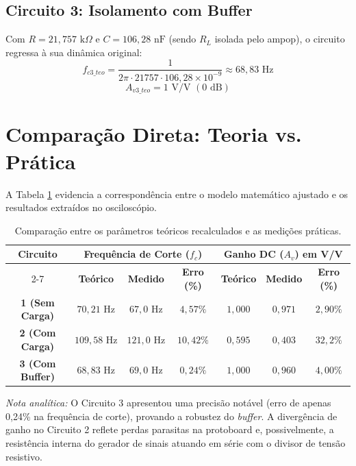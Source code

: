 \subsection{Circuito 3: Isolamento com Buffer}
Com $R = 21,757\text{ k}\Omega$ e $C = 106,28\text{ nF}$ (sendo $R_L$ isolada pelo ampop), o circuito regressa à sua dinâmica original:
\begin{equation}
	f_{c3\_teo} = \frac{1}{2\pi \cdot 21757 \cdot 106,28 \times 10^{-9}} \approx 68,83\text{ Hz}
\end{equation}
\begin{equation}
	A_{v3\_teo} = 1\text{ V/V } (0\text{ dB})
\end{equation}

\section{Comparação Direta: Teoria vs. Prática}

A Tabela \ref{tab:comparacao_parametros} evidencia a correspondência entre o modelo matemático ajustado e os resultados extraídos no osciloscópio.

\begin{table}[H]
	\centering
	\caption{Comparação entre os parâmetros teóricos recalculados e as medições práticas.}
	\label{tab:comparacao_parametros}
	\renewcommand{\arraystretch}{1.3}
	\begin{tabular}{ccccccc}
		\hline
		\multirow{2}{*}{\textbf{Circuito}} & \multicolumn{3}{c}{\textbf{Frequência de Corte ($f_c$)}} & \multicolumn{3}{c}{\textbf{Ganho DC ($A_v$) em V/V}} \\ \cline{2-7} 
		& \textbf{Teórico} & \textbf{Medido} & \textbf{Erro (\%)} & \textbf{Teórico} & \textbf{Medido} & \textbf{Erro (\%)} \\ \hline
		\textbf{1 (Sem Carga)} & $70,21\text{ Hz}$ & $67,0\text{ Hz}$ & $4,57\%$ & $1,000$ & $0,971$ & $2,90\%$ \\
		\textbf{2 (Com Carga)} & $109,58\text{ Hz}$ & $121,0\text{ Hz}$ & $10,42\%$ & $0,595$ & $0,403$ & $32,2\%$ \\
		\textbf{3 (Com Buffer)} & $68,83\text{ Hz}$ & $69,0\text{ Hz}$ & $0,24\%$ & $1,000$ & $0,960$ & $4,00\%$ \\ \hline
	\end{tabular}
\end{table}

\textit{Nota analítica:} O Circuito 3 apresentou uma precisão notável (erro de apenas 0,24\% na frequência de corte), provando a robustez do \textit{buffer}. A divergência de ganho no Circuito 2 reflete perdas parasitas na protoboard e, possivelmente, a resistência interna do gerador de sinais atuando em série com o divisor de tensão resistivo.

